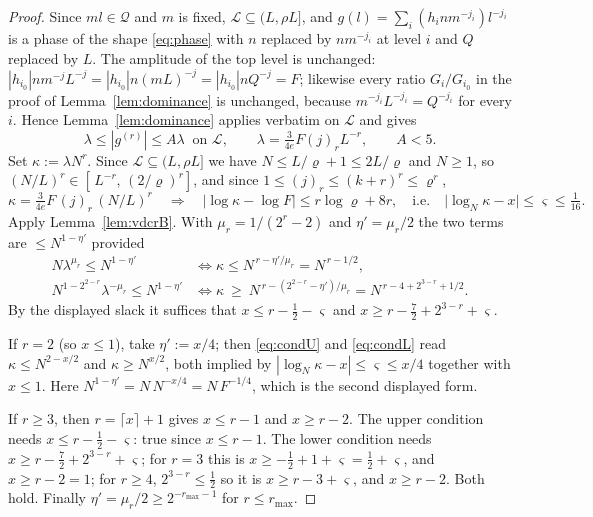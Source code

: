 \documentclass[11pt]{article}
\theoremstyle{definition}
\theoremstyle{plain}
\begin{document}
\begin{proof}
Since $ml\in\mathcal Q$ and $m$ is fixed, $\mathcal L\subseteq(L,\rho L]$,
and $g(l)=\sum_{i}(h_{i}nm^{-j_{i}})l^{-j_{i}}$ is a phase of the shape
\eqref{eq:phase} with $n$ replaced by $nm^{-j_{i}}$ at level $i$ and $Q$
replaced by $L$.  The amplitude of the top level is unchanged:
$|h_{i_{0}}|nm^{-j}L^{-j}=|h_{i_{0}}|n(mL)^{-j}=|h_{i_{0}}|nQ^{-j}=F$;
likewise every ratio $G_{i}/G_{i_{0}}$ in the proof of
Lemma~\ref{lem:dominance} is unchanged, because $m^{-j_{i}}L^{-j_{i}}
=Q^{-j_{i}}$ for every $i$.  Hence Lemma~\ref{lem:dominance} applies
verbatim on $\mathcal L$ and gives
\[
\lambda\le|g^{(r)}|\le A\lambda\ \text{ on }\mathcal L,\qquad
\lambda=\tfrac{3}{4e}F(j)_{r}L^{-r},\qquad A<5 .
\]
Set $\kappa:=\lambda N^{r}$.  Since $\mathcal L\subseteq(L,\rho L]$ we
have $N\le L/\varrho+1\le2L/\varrho$ and $N\ge1$, so
$(N/L)^{r}\in[\,L^{-r},\,(2/\varrho)^{r}]$, and since
$1\le(j)_{r}\le(k+r)^{r}\le\varrho^{r}$,
\[
\kappa=\tfrac{3}{4e}F\,(j)_{r}\,(N/L)^{r}
\quad\Longrightarrow\quad
\bigl|\log\kappa-\log F\bigr|\le r\log\varrho+8r,
\quad\text{i.e.}\quad
\bigl|\log_{N}\kappa-x\bigr|\le\varsigma\le\tfrac1{16}.
\]
Apply Lemma~\ref{lem:vdcrB}.  With $\mu_{r}=1/(2^{r}-2)$ and
$\eta'=\mu_{r}/2$ the two terms are $\le N^{1-\eta'}$ provided
\begin{align}
N\lambda^{\mu_{r}}\le N^{1-\eta'}
&\iff \kappa\le N^{\,r-\eta'/\mu_{r}}=N^{\,r-1/2},
\label{eq:condU}\\
N^{1-2^{2-r}}\lambda^{-\mu_{r}}\le N^{1-\eta'}
&\iff \kappa\ \ge\ N^{\,r-(2^{2-r}-\eta')/\mu_{r}}
=N^{\,r-4+2^{3-r}+1/2}. \label{eq:condL}
\end{align}
By the displayed slack it suffices that
$x\le r-\tfrac12-\varsigma$ and $x\ge r-\tfrac72+2^{3-r}+\varsigma$.

If $r=2$ (so $x\le1$), take $\eta':=x/4$; then \eqref{eq:condU} and
\eqref{eq:condL} read $\kappa\le N^{2-x/2}$ and $\kappa\ge N^{x/2}$, both
implied by $|\log_{N}\kappa-x|\le\varsigma\le x/4$ together with $x\le1$.
Here $N^{1-\eta'}=N\,N^{-x/4}=N\,F^{-1/4}$, which is the second displayed
form.

If $r\ge3$, then $r=\lceil x\rceil+1$ gives $x\le r-1$ and $x\ge r-2$.
The upper condition needs $x\le r-\tfrac12-\varsigma$: true since
$x\le r-1$.  The lower condition needs
$x\ge r-\tfrac72+2^{3-r}+\varsigma$; for $r=3$ this is
$x\ge-\tfrac12+1+\varsigma=\tfrac12+\varsigma$, and $x\ge r-2=1$; for
$r\ge4$, $2^{3-r}\le\tfrac12$ so it is $x\ge r-3+\varsigma$, and
$x\ge r-2$.  Both hold.  Finally $\eta'=\mu_{r}/2\ge2^{-r_{\max}-1}$ for
$r\le r_{\max}$.
\end{proof}
\end{document}
